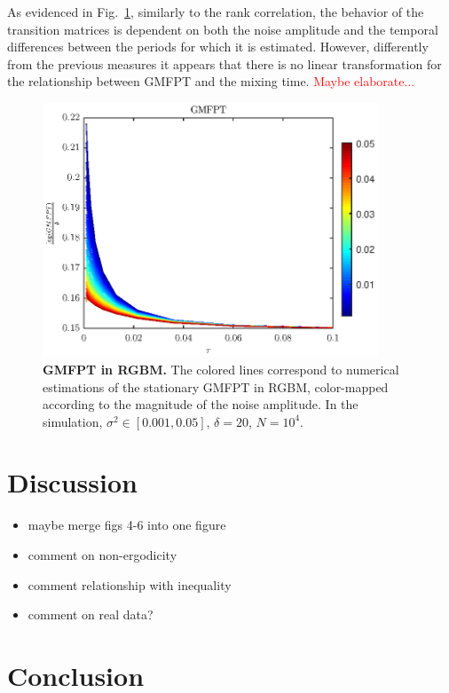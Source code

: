 \documentclass[11pt]{article}
\numberwithin{equation}{section}
\begin{document}
As evidenced in Fig.~\ref{fig:rgbm-gmfpt}, similarly to the rank correlation, the behavior of the transition matrices is dependent on both the noise amplitude and the temporal differences between the periods for which it is estimated. However, differently from the previous measures it appears that there is no linear transformation for the relationship between GMFPT and the mixing time. \textcolor{red}{Maybe elaborate...}

\begin{figure}[t!]
\includegraphics[width=10cm]{figs/fig_gmfpt_rgbm.eps}
\caption{\textbf{GMFPT in RGBM.} The colored lines correspond to numerical estimations of the stationary GMFPT in RGBM, color-mapped according to the magnitude of the noise amplitude. In the simulation, $\sigma^2 \in \left[ 0.001, 0.05\right]$, $\delta = 20$, $N = 10^4$. \label{fig:rgbm-gmfpt}}
\end{figure}






\section{Discussion}
\begin{itemize}
    \item maybe merge figs 4-6 into one figure
    \item comment on non-ergodicity
    \item comment relationship with inequality
    \item comment on real data?
\end{itemize}

\section{Conclusion}\label{sec:conclusion}

\end{document}
